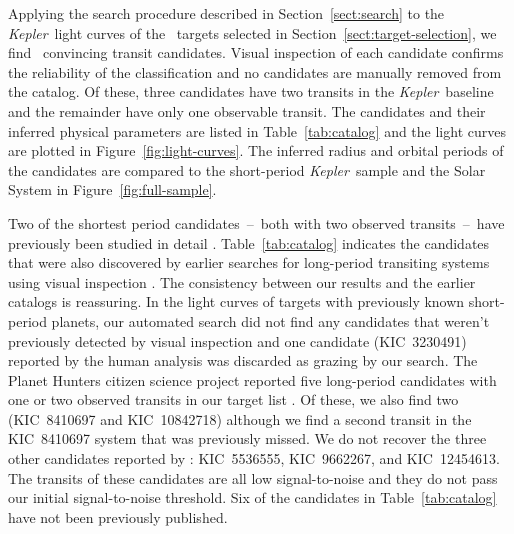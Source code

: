 \documentclass[manuscript, letterpaper]{aastex6}
\makeatletter
\let\origsubsection\subsection
\renewcommand\subsection{\@ifstar{\starsubsection}{\nostarsubsection}}
\newcommand\nostarsubsection[1]{\subsectionprelude\origsubsection{#1}}
\newcommand\starsubsection[1]{\subsectionprelude\origsubsection*{#1}}
\newcommand\subsectionprelude{\vspace{1em}}
\newcommand{\project}[1]{\textsl{#1}}
\newcommand{\kepler}{\project{Kepler}}
\newcommand{\dfmfigref}[1]{\ref{fig:#1}}
\newcommand{\dfmFig}[1]{Figure~\dfmfigref{#1}}
\newcommand{\dfmfig}[1]{\dfmFig{#1}}
\newcommand{\sectionname}{Section}
\newcommand{\sectref}[1]{\ref{sect:#1}}
\newcommand{\Sect}[1]{\sectionname~\sectref{#1}}
\newcommand{\sect}[1]{\Sect{#1}}
\newcommand{\sectlabel}[1]{\label{sect:#1}}
\makeatother
\begin{document}
\subsection{Catalog of transit candidates}\sectlabel{catalog}

Applying the search procedure described in \sect{search} to the \kepler\ light
curves of the \numtargets\ targets selected in \sect{target-selection}, we
find \numcands\ convincing transit candidates.
Visual inspection of each candidate confirms the reliability of the
classification and no candidates are manually removed from the catalog.
Of these, three candidates have two transits in the \kepler\ baseline and the
remainder have only one observable transit.
The candidates and their inferred physical parameters are listed in
Table~\ref{tab:catalog} and the light curves are plotted in
\dfmfig{light-curves}.
The inferred radius and orbital periods of the candidates are compared to the
short-period \kepler\ sample and the Solar System in \dfmfig{full-sample}.

Two of the shortest period candidates~--~both with two observed
transits~--~have previously been studied in detail \citep[KIC~8800954 and
KIC~3239945;][]{Kipping:2014a, Kipping:2016}.
Table~\ref{tab:catalog} indicates the candidates that were also discovered by
earlier searches for long-period transiting systems using visual inspection
\citep{Wang:2015, Uehara:2016}.
The consistency between our results and the earlier catalogs is reassuring.
In the light curves of targets with previously known short-period planets, our
automated search did not find any candidates that weren't previously detected
by visual inspection \citep{Uehara:2016} and one candidate (KIC~3230491)
reported by the human analysis was discarded as grazing by our search.
The Planet Hunters citizen science project \citep{Fischer:2012} reported five
long-period candidates with one or two observed transits in our target list
\citep{Wang:2015}.
Of these, we also find two (KIC~8410697 and KIC~10842718) although we find a
second transit in the KIC~8410697 system that was previously missed.
We do not recover the three other candidates reported by \citet{Wang:2015}:
KIC~5536555, KIC~9662267, and KIC~12454613.
The transits of these candidates are all low signal-to-noise and they do not
pass our initial signal-to-noise threshold.
Six of the candidates in Table~\ref{tab:catalog} have not been previously
published.
\end{document}
